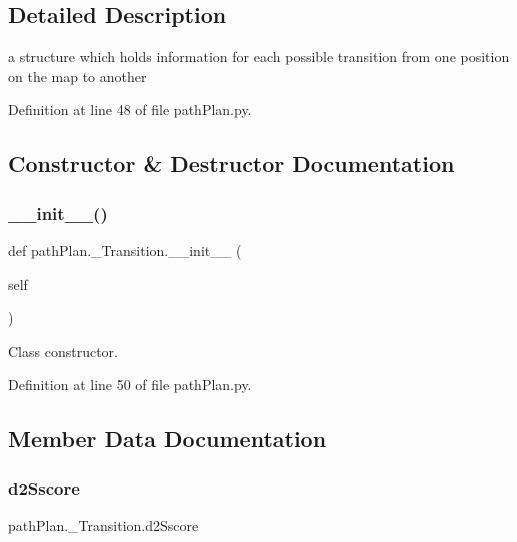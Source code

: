 \subsection{Detailed Description}
a structure which holds information for each possible transition from one position on the map to another 

Definition at line 48 of file path\+Plan.\+py.



\subsection{Constructor \& Destructor Documentation}
\mbox{\label{classpath_plan_1_1___transition_ae6a85dd74adbd4cda96fded2ba5d398e}} 
\subsubsection{\texorpdfstring{\+\_\+\+\_\+init\+\_\+\+\_\+()}{\_\_init\_\_()}}
{\footnotesize\ttfamily def path\+Plan.\+\_\+\+Transition.\+\_\+\+\_\+init\+\_\+\+\_\+ (\begin{DoxyParamCaption}\item[{}]{self }\end{DoxyParamCaption})}



Class constructor. 



Definition at line 50 of file path\+Plan.\+py.



\subsection{Member Data Documentation}
\mbox{\label{classpath_plan_1_1___transition_a03af53bb2bb866253742341b1c7b33fd}} 
\subsubsection{\texorpdfstring{d2\+Sscore}{d2Sscore}}
{\footnotesize\ttfamily path\+Plan.\+\_\+\+Transition.\+d2\+Sscore}



